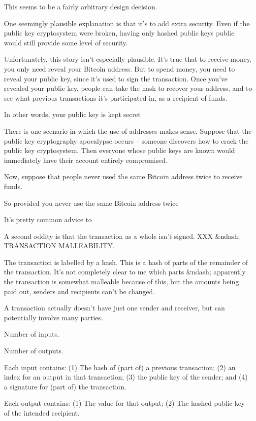 This seems to be a fairly arbitrary design decision.  

One seemingly plausible explanation is that it's to add extra
security.  Even if the public key cryptosystem were broken, having
only hashed public keys public would still provide some level of
security.

Unfortunately, this story isn't especially plausible.  It's true that
to receive money, you only need reveal your Bitcoin address.  But to
spend money, you need to reveal your public key, since it's used to
sign the transaction.  Once you've revealed your public key, people
can take the hash to recover your address, and to see what previous
transactions it's participated in, as a recipient of funds.

In other words, your public key is kept secret


There is one scenario in which the use of addresses makes sense.
Suppose that the public key cryptography apocalypse occurs -- someone
discovers how to crack the public key cryptosystem.  Then everyone
whose public keys are known would immediately have their account
entirely compromised.  

Now, suppose that people never used the same Bitcoin address twice to
receive funds.

So provided you never use the same Bitcoin address twice

It's pretty common advice to  

A second oddity is that the transaction as a whole isn't signed.  XXX
&ndash; TRANSACTION MALLEABILITY.




The transaction is labelled by a hash.  This is a hash of parts of the
remainder of the transaction.  It's not completely clear to me which
parts &ndash; apparently the transaction is somewhat malleable because of
this, but the amounts being paid out, senders and recipients can't be
changed.

A transaction actually doesn't have just one sender and receiver, but
can potentially involve many parties. 


Number of inputs.

Number of outputs.

Each input contains: (1) The hash of (part of) a previous transaction;
(2) an index for an output in that transaction; (3) the public key of
the sender; and (4) a signature for (part of) the transaction.



Each output contains: (1) The value for that output; (2) The hashed
public key of the intended recipient.

